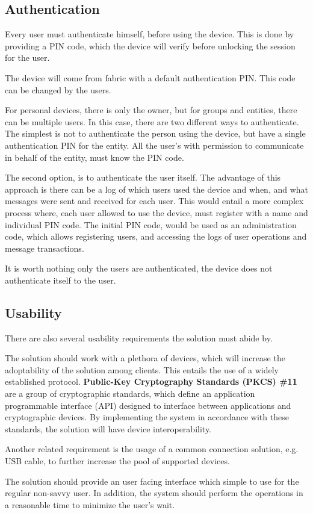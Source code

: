 \subsection{Authentication} \label{chap:problem:services:auth}
Every user must authenticate himself, before using the device. This is done by providing a PIN code, which the device will verify before unlocking the session for the user.

The device will come from fabric with a default authentication PIN. This code can be changed by the users.

For personal devices, there is only the owner, but for groups and entities, there can be multiple users. In this case, there are two different ways to authenticate. The simplest is not to authenticate the person using the device, but have a single authentication PIN for the entity. All the user's with permission to communicate in behalf of the entity, must know the PIN code.

The second option, is to authenticate the user itself. The advantage of this approach is there can be a log of which users used the device and when, and what messages were sent and received for each user.
This would entail a more complex process where, each user allowed to use the device, must register with a name and individual PIN code. The initial PIN code, would be used as an administration code, which allows registering users, and accessing the logs of user operations and message transactions.

It is worth nothing only the users are authenticated, the device does not authenticate itself to the user.

\subsection{Usability} \label{chap:problem:services:usability}
There are also several usability requirements the solution must abide by.

The solution should work with a plethora of devices, which will increase the adoptability of the solution among clients. This entails the use of a widely established protocol.
\textbf{Public-Key Cryptography Standards (PKCS) \#11} are a group of cryptographic standards, which define an application programmable interface (API) designed to interface between applications and cryptographic devices. By implementing the system in accordance with these standards, the solution will have device interoperability.

Another related requirement is the usage of a common connection solution, e.g. USB cable, to further increase the pool of supported devices.

The solution should provide an user facing interface which simple to use for the regular non-savvy user.
In addition, the system should perform the operations in a reasonable time to minimize the user's wait.
